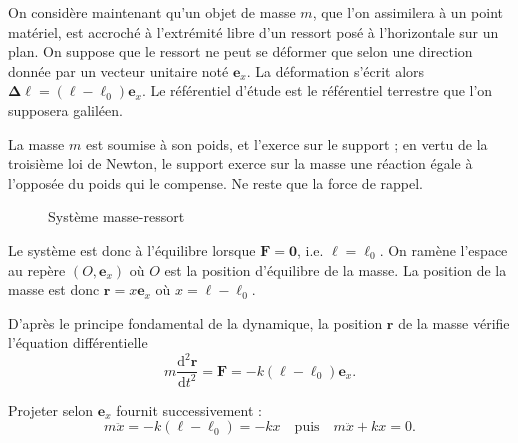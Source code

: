 \documentclass{article}
\renewcommand{\vec}[1]{\boldsymbol{\mathbf{#1}}}
\theoremstyle{definition}
\newcommand{\od}[3][]{\frac{\mathrm d^{#1}#2}{\mathrm d#3^{#1}}}
\begin{document}
On considère maintenant qu'un objet de masse $m$, que l'on assimilera à un point matériel, est accroché à l'extrémité libre d'un ressort posé à l'horizontale sur un plan. On suppose que le ressort ne peut se déformer que selon une direction donnée par un vecteur unitaire noté $\vec{e}_x$. La déformation s'écrit alors $\vec{\Delta\ell}=(\ell-\ell_0)\vec{e}_x$. Le référentiel d'étude est le référentiel terrestre que l'on supposera galiléen. 

La masse $m$ est soumise à son poids, et l'exerce sur le support ; en vertu de la troisième loi de Newton, le support exerce sur la masse une réaction égale à l'opposée du poids qui le compense. Ne reste que la force de rappel.

\begin{figure}
\centering
{}
\caption{Système masse-ressort}
\end{figure}

Le système est donc à l'équilibre lorsque $\vec{F}=\vec{0}$, i.e. $\ell=\ell_0$. On ramène l'espace au repère $(O,\vec{e}_x)$ où $O$ est la position d'équilibre de la masse. La position de la masse est donc $\vec{r}=x\vec{e}_x$ où $x=\ell-\ell_0$.

D'après le principe fondamental de la dynamique, la position $\vec{r}$ de la masse vérifie l'équation différentielle
    \[
    m\od[2]{\vec{r}}{t} = \vec{F} = -k(\ell-\ell_0)\vec{e}_x.
    \]

Projeter selon $\vec{e}_x$ fournit successivement :
    \begin{equation}\label{springmassEq}
    m\ddot{x} = -k(\ell-\ell_0)=-kx
    \quad \text{puis}\quad m\ddot{x} + kx =0.
    \end{equation}
\end{document}
